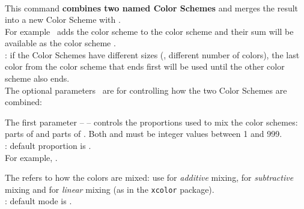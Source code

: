 \subsubsection*{}{\pgfPTMlibsubsubsection{\tmpSection}}\vspace{6pt}%
\label{command:pgfPTCScombine}%
%
\\ [10pt]This command \textbf{combines two named Color Schemes} and merges the result into a new Color Scheme with .
\\ For example \lb{}\rb\ adds the color scheme  to the color scheme  and their sum will be available as the color scheme .
\\ [3pt]: if the Color Schemes have different sizes (\ie, different number of colors), the last color from the color scheme that ends first will be used until the other color scheme also ends.
\\ [3pt]The optional parameters \lp{}\rp\ are for controlling how the two Color Schemes are combined:
\vspace{4pt}%
\begin{itemlist}
\item The first parameter --  -- controls the proportions used to mix the color schemes:  parts of  and  parts of  .  Both  and  must be integer values between 1 and 999.
\\ [3pt]: default proportion is .
\\ For example,  .
\item The  refers to how the colors are mixed: use  for \textit{additive} mixing,  for \textit{subtractive} mixing and  for \textit{linear} mixing (as in the \texttt{\large xcolor} package).
\\ [3pt]: default mode is .
\end{itemlist}
